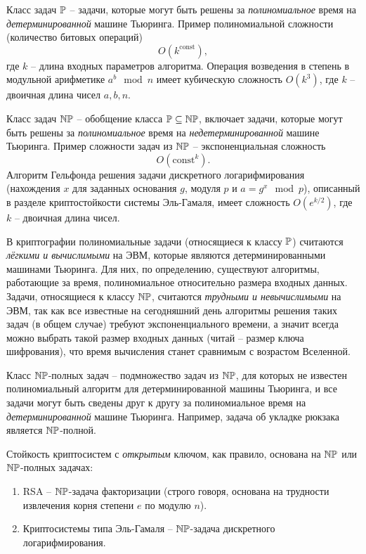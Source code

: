 Класс задач $\mathbb{P}$ -- задачи, которые могут быть решены за \emph{полиномиальное} время на \emph{детерминированной} машине Тьюринга. Пример полиномиальной сложности (количество битовых операций)
    \[ O(k^{\textrm{const}}), \]
где $k$ -- длина входных параметров алгоритма. Операция возведения в степень в модульной арифметике $a^b \mod n$ имеет кубическую сложность $O(k^3)$, где $k$ -- двоичная длина чисел $a,b,n$.

Класс задач $\mathbb{NP}$ -- обобщение класса $\mathbb{P} \subseteq \mathbb{NP}$, включает задачи, которые могут быть решены за \emph{полиномиальное} время на \emph{недетерминированной} машине Тьюринга. Пример сложности задач из $\mathbb{NP}$ -- экспоненциальная сложность
    \[ O(\textrm{const}^k). \]
Алгоритм Гельфонда решения задачи дискретного логарифмирования (нахождения $x$ для заданных основания $g$, модуля $p$ и $a = g^x \mod p$), описанный в разделе криптостойкости системы Эль-Гамаля, имеет сложность $O(e^{k/2})$, где $k$ -- двоичная длина чисел.

В криптографии полиномиальные задачи (относящиеся к классу $\mathbb{P}$) считаются \emph{лёгкими и вычислимыми} на ЭВМ, которые являются детерминированными машинами Тьюринга. Для них, по определению, существуют алгоритмы, работающие за время, полиномиальное относительно размера входных данных. Задачи, относящиеся к классу $\mathbb{NP}$, считаются \emph{трудными и невычислимыми} на ЭВМ, так как все известные на сегодняшний день алгоритмы решения таких задач (в общем случае) требуют экспоненциального времени, а значит всегда можно выбрать такой размер входных данных (читай -- размер ключа шифрования), что время вычисления станет сравнимым с возрастом Вселенной.

Класс $\mathbb{NP}$-полных задач -- подмножество задач из $\mathbb{NP}$, для которых не известен полиномиальный алгоритм для детерминированной машины Тьюринга, и все задачи могут быть сведены друг к другу за полиномиальное время на \emph{детерминированной} машине Тьюринга. Например, задача об укладке рюкзака является $\mathbb{NP}$-полной.

Стойкость криптосистем с \emph{открытым} ключом, как правило, основана на $\mathbb{NP}$ или $\mathbb{NP}$-полных задачах:
\begin{enumerate}
    \item RSA -- $\mathbb{NP}$-задача факторизации (строго говоря, основана на трудности извлечения корня степени $e$ по модулю $n$).
    \item Криптосистемы типа Эль-Гамаля -- $\mathbb{NP}$-задача дискретного логарифмирования.
\end{enumerate}

